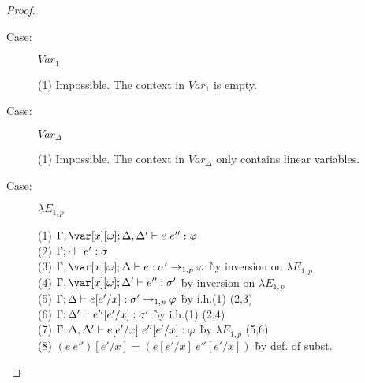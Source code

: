 \begin{proof}
\begin{description}
\item[Case:] $Var_1$
\begin{tabbing}
  (1) Impossible. The context in $Var_1$ is empty.
\end{tabbing}

\item[Case:] $Var_\Delta$
\begin{tabbing}
  (1) Impossible. The context in $Var_\Delta$ only contains linear variables.
\end{tabbing}


\item[Case:] $\lambda E_{1,p}$
\begin{tabbing}
  (1) $\G, \xo; \D,\D' \vdash e~e'' : \vp$\\
  (2) $\Gamma; \cdot \vdash e' : \sigma$\\
  (3) $\G, \xo; \D \vdash e : \s'\to_{1,p}\vp$ \` by inversion on $\lambda E_{1,p}$\\
  (4) $\G, \xo; \D' \vdash e'' : \s'$ \` by inversion on $\lambda E_{1,p}$\\
  (5) $\Gamma; \Delta \vdash e[e'/x] : \sigma'\to_{1,p}\varphi$ \` by i.h.(1) (2,3)\\
  (6) $\Gamma; \Delta' \vdash e''[e'/x] : \sigma'$ \` by i.h.(1) (2,4)\\
  (7) $\Gamma; \Delta, \Delta' \vdash e[e'/x]~e''[e'/x] : \varphi$ \` by $\lambda E_{1,p}$ (5,6)\\
  (8) $(e~e'')[e'/x] = (e[e'/x]~e''[e'/x])$ \` by def. of subst.\\
\end{tabbing}



\end{description}
\end{proof}

